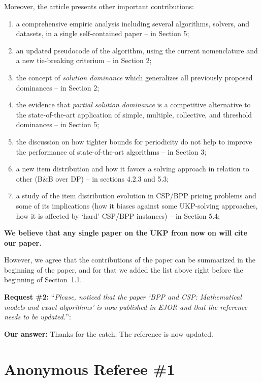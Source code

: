 \documentclass{elsarticle}
\begin{document}
Moreover, the article presents other important contributions:
\begin{enumerate}
\item a comprehensive empiric analysis including several algorithms, solvers, and datasets, in a single self-contained paper -- in Section 5;
\item an updated pseudocode of the algorithm, using the current nomenclature and a new tie-breaking criterium -- in Section 2;
\item the concept of \emph{solution dominance} which generalizes all previously proposed dominances -- in Section 2;
\item the evidence that \emph{partial solution dominance} is a competitive alternative to the state-of-the-art application of simple, multiple, collective, and threshold dominances -- in Section 5;
\item the discussion on how tighter bounds for periodicity do not help to improve the performance of state-of-the-art algorithms -- in Section 3;
\item a new item distribution and how it favors a solving approach in relation to other (B\&B over DP) -- in sections 4.2.3 and 5.3;
\item a study of the item distribution evolution in CSP/BPP pricing problems and some of its implications (how it biases against some UKP-solving approaches, how it is affected by `hard' CSP/BPP instances) -- in Section 5.4;
\end{enumerate}

\textbf{We believe that any single paper on the UKP from now on will cite our paper.}

However, we agree that the contributions of the paper can be summarized in the beginning of the paper, and for that we added the list above right before the beginning of Section~1.1.

\bigskip

\textbf{Request \#2:} ``\textit{Please, noticed that the paper `BPP and CSP: Mathematical models and exact algorithms' is now published in EJOR and that the reference needs to be updated.}'':

\textbf{Our answer:} Thanks for the catch. The reference is now updated.

\section{Anonymous Referee \#1}
\end{document}
